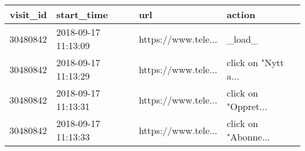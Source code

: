 \begin{tabular}{rlll}
\toprule
 visit\_id &          start\_time &                  url &               action \\
\midrule
 30480842 & 2018-09-17 11:13:09 &  https://www.tele... &               \_load\_ \\
 30480842 & 2018-09-17 11:13:29 &  https://www.tele... &  click on "Nytt a... \\
 30480842 & 2018-09-17 11:13:31 &  https://www.tele... &  click on "Oppret... \\
 30480842 & 2018-09-17 11:13:33 &  https://www.tele... &  click on "Abonne... \\
\bottomrule
\end{tabular}
